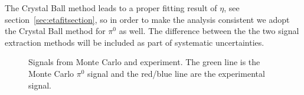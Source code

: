  The Crystal Ball method leads to a proper fitting result of $\eta$, see section~\ref{sec:etafitsection}, so in order to make the analysis consistent we adopt the Crystal Ball method for $\pi^0$ as well. The difference between the the two signal extraction methods will be included as part of systematic uncertainties.
\begin{figure}[H]
  \centering     
  \caption{Signals from Monte Carlo and experiment. The green line is the Monte Carlo $\pi^0$ signal and the  red/blue line are the experimental signal.}
  \label{fig:pi0mcexpsig}
\end{figure}

